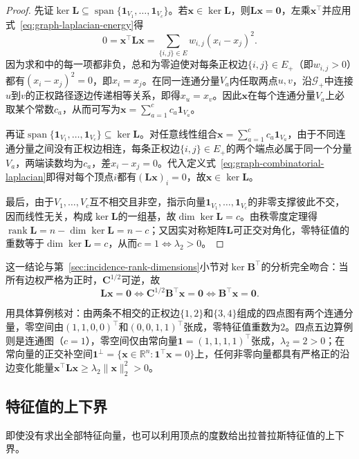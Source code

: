 \begin{proof}
先证$\ker\bm L\subseteq\operatorname{span}\{\bm 1_{V_1},\ldots,\bm 1_{V_c}\}$。若$\bm x\in\ker\bm L$，则$\bm L\bm x=\bm 0$，左乘$\bm x^\top$并应用式~\eqref{eq:graph-laplacian-energy}得
\[
  0=\bm x^\top\bm L\bm x=\sum_{\{i,j\}\in E}w_{i,j}(x_i-x_j)^2.
\]
因为求和中的每一项都非负，总和为零迫使对每条正权边$\{i,j\}\in E_+$（即$w_{i,j}>0$）都有$(x_i-x_j)^2=0$，即$x_i=x_j$。在同一连通分量$V_a$内任取两点$u,v$，沿$\mathcal G_+$中连接$u$到$v$的正权路径逐边传递相等关系，即得$x_u=x_v$。因此$\bm x$在每个连通分量$V_a$上必取某个常数$c_a$，从而可写为$\bm x=\sum_{a=1}^c c_a\bm 1_{V_a}$。

再证$\operatorname{span}\{\bm 1_{V_1},\ldots,\bm 1_{V_c}\}\subseteq\ker\bm L$。对任意线性组合$\bm x=\sum_{a=1}^c c_a\bm 1_{V_a}$，由于不同连通分量之间没有正权边相连，每条正权边$\{i,j\}\in E_+$的两个端点必属于同一个分量$V_a$，两端读数均为$c_a$，差$x_i-x_j=0$。代入定义式~\eqref{eq:graph-combinatorial-laplacian}即得对每个顶点$i$都有$(\bm L\bm x)_i=0$，故$\bm x\in\ker\bm L$。

最后，由于$V_1,\ldots,V_c$互不相交且非空，指示向量$\bm 1_{V_1},\ldots,\bm 1_{V_c}$的非零支撑彼此不交，因而线性无关，构成$\ker\bm L$的一组基，故$\dim\ker\bm L=c$。由秩零度定理得$\operatorname{rank}\bm L=n-\dim\ker\bm L=n-c$；又因实对称矩阵$\bm L$可正交对角化，零特征值的重数等于$\dim\ker\bm L=c$，从而$c=1\iff\lambda_2>0$。
\end{proof}

这一结论与第~\ref{sec:incidence-rank-dimensions}小节对$\ker\bm B^\top$的分析完全吻合：当所有边权严格为正时，$\bm C^{1/2}$可逆，故
\[
  \bm L\bm x=\bm 0
  \iff \bm C^{1/2}\bm B^\top\bm x=\bm 0
  \iff \bm B^\top\bm x=\bm 0.
\]

用具体算例核对：由两条不相交的正权边$\{1,2\}$和$\{3,4\}$组成的四点图有两个连通分量，零空间由$(1,1,0,0)^\top$和$(0,0,1,1)^\top$张成，零特征值重数为$2$。四点五边算例则是连通图（$c=1$），零空间仅由常向量$\bm 1=(1,1,1,1)^\top$张成，$\lambda_2=2>0$；在常向量的正交补空间$\bm 1^\perp=\{\bm x\in\mathbb R^n:\bm 1^\top\bm x=0\}$上，任何非零向量都具有严格正的沿边变化能量$\bm x^\top\bm L\bm x\geq\lambda_2\lVert\bm x\rVert_2^2>0$。

\subsection{特征值的上下界}
\label{sec:graph-laplacian-eigenvalue-bounds}

即使没有求出全部特征向量，也可以利用顶点的度数给出拉普拉斯特征值的上下界。

